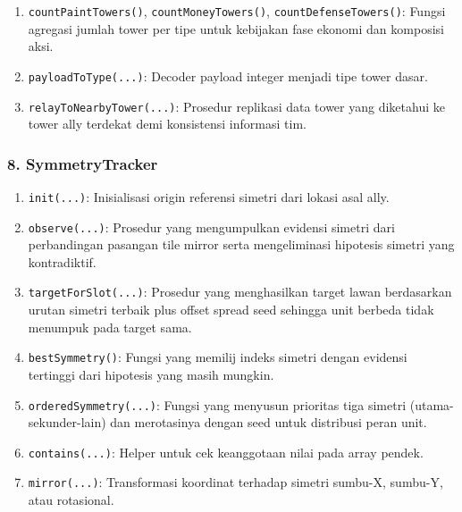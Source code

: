 \begin{enumerate}
	\item \texttt{countPaintTowers()}, \texttt{countMoneyTowers()}, \texttt{countDefenseTowers()}:
	      Fungsi agregasi jumlah tower per tipe untuk kebijakan fase ekonomi dan komposisi aksi.

	\item \texttt{payloadToType(...)}:
	      Decoder payload integer menjadi tipe tower dasar.

	\item \texttt{relayToNearbyTower(...)}:
	      Prosedur replikasi data tower yang diketahui ke tower ally terdekat demi konsistensi informasi tim.
\end{enumerate}

\subsubsection{8. SymmetryTracker}
\begin{enumerate}
	\item \texttt{init(...)}:
	      Inisialisasi origin referensi simetri dari lokasi asal ally.

	\item \texttt{observe(...)}:
	      Prosedur yang mengumpulkan evidensi simetri dari perbandingan pasangan tile mirror serta mengeliminasi hipotesis simetri yang kontradiktif.

	\item \texttt{targetForSlot(...)}:
	      Prosedur yang menghasilkan target lawan berdasarkan urutan simetri terbaik plus offset spread seed sehingga unit berbeda tidak menumpuk pada target sama.

	\item \texttt{bestSymmetry()}:
	      Fungsi yang memilij indeks simetri dengan evidensi tertinggi dari hipotesis yang masih mungkin.

	\item \texttt{orderedSymmetry(...)}:
	      Fungsi yang menyusun prioritas tiga simetri (utama-sekunder-lain) dan merotasinya dengan seed untuk distribusi peran unit.

	\item \texttt{contains(...)}:
	      Helper untuk cek keanggotaan nilai pada array pendek.

	\item \texttt{mirror(...)}:
	      Transformasi koordinat terhadap simetri sumbu-X, sumbu-Y, atau rotasional.
\end{enumerate}



